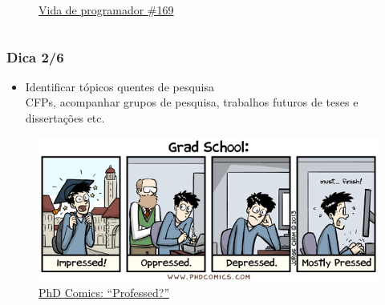 \begin{frame}
\begin{columns}
\begin{column}{0.5\linewidth}
\begin{figure}
                \caption{\href{https://developerslife.tech/pt/2011/07/12/voce-e-do-suporte/}{Vida de programador \#169}}
            \end{figure}
        \end{column}
    \end{columns}    
\end{frame}

\begin{frame}
    \frametitle{Dica 2/6}
        \begin{itemize}
            \item Identificar tópicos quentes de pesquisa \\
            \vspace{0.5cm}
            {\small CFPs, acompanhar grupos de pesquisa, trabalhos futuros de teses e dissertações etc.}
        \end{itemize}
        \begin{figure}
            \centering
            \includegraphics[width=\linewidth]{figs/phdcomics.png}
            \caption{\href{https://phdcomics.com/comics/archive_print.php?comicid=1672}{PhD Comics: ``Professed?''}}
        \end{figure}
\end{frame}

